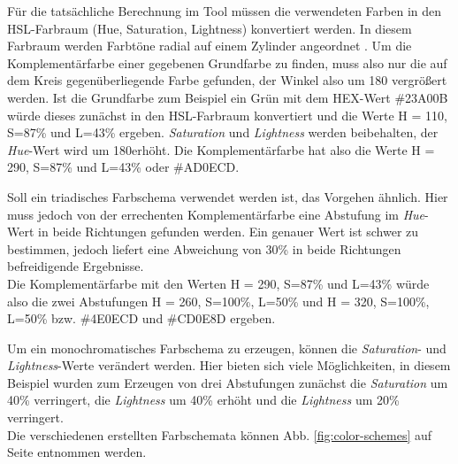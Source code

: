 Für die tatsächliche Berechnung im Tool müssen die verwendeten Farben in den HSL-Farbraum (Hue, Saturation, Lightness) konvertiert werden. In diesem Farbraum werden Farbtöne radial auf einem Zylinder angeordnet \cite{joblove1978color}.
Um die Komplementärfarbe einer gegebenen Grundfarbe zu finden, muss also nur die auf dem Kreis gegenüberliegende Farbe gefunden, der Winkel also um 180 \degree vergrößert werden. 
Ist die Grundfarbe zum Beispiel ein Grün mit dem HEX-Wert \#23A00B würde dieses zunächst in den HSL-Farbraum konvertiert und die Werte H = 110\degree, S=87\% und L=43\% ergeben. \textit{Saturation} und \textit{Lightness} werden beibehalten, der \textit{Hue}-Wert wird um 180\degree erhöht. Die Komplementärfarbe hat also die Werte  H = 290\degree, S=87\% und L=43\% oder \#AD0ECD.

Soll ein triadisches Farbschema verwendet werden ist, das Vorgehen ähnlich. Hier muss jedoch von der errechenten Komplementärfarbe eine Abstufung im \textit{Hue}-Wert in beide Richtungen gefunden werden. Ein genauer Wert ist schwer zu bestimmen, jedoch liefert eine Abweichung von 30\% in beide Richtungen befreidigende Ergebnisse.\\
Die Komplementärfarbe mit den Werten  H = 290\degree, S=87\% und L=43\% würde also die zwei Abstufungen H = 260\degree, S=100\%, L=50\% und H = 320\degree, S=100\%, L=50\% bzw. \#4E0ECD und \#CD0E8D ergeben.

Um ein monochromatisches Farbschema zu erzeugen, können die \textit{Saturation}- und \textit{Lightness}-Werte verändert werden. Hier bieten sich viele Möglichkeiten, in diesem Beispiel wurden zum Erzeugen von drei Abstufungen zunächst die \textit{Saturation} um 40\% verringert, die \textit{Lightness} um 40\% erhöht und die \textit{Lightness} um 20\% verringert.\\
Die verschiedenen erstellten Farbschemata können Abb. \ref{fig:color-schemes} auf Seite \pageref{fig:color-schemes} entnommen werden. 

